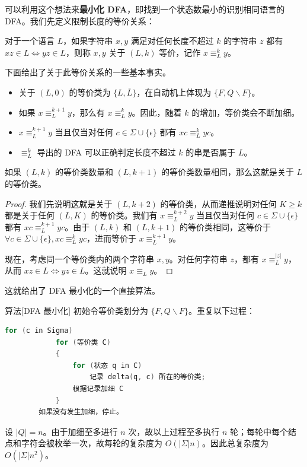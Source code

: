 可以利用这个想法来\textbf{最小化 DFA}，即找到一个状态数最小的识别相同语言的 DFA。我们先定义限制长度的等价关系：

\begin{definition}
    对于一个语言 $L$，如果字符串 $x,y$ 满足对任何长度不超过 $k$ 的字符串 $z$ 都有 $xz\in L\Longleftrightarrow yz\in L$，则称 $x,y$ 关于 $(L,k)$ 等价，记作 $x\equiv_L^k y$。
\end{definition}

下面给出了关于此等价关系的一些基本事实。
\begin{fact}
    \begin{itemize}
        \item 关于 $(L,0)$ 的等价类为 $\{L,\bar L\}$，在自动机上体现为 $\{F,Q\backslash F\}$。
        \item 如果 $x\equiv_L^{k+1} y$，那么有 $x\equiv_L^k y$。因此，随着 $k$ 的增加，等价类会不断加细。
        \item $x\equiv_L^{k+1} y$ 当且仅当对任何 $c\in \Sigma\cup\{\epsilon\}$ 都有 $xc\equiv_L^k yc$。
        \item $\equiv_L^k$ 导出的 DFA 可以正确判定长度不超过 $k$ 的串是否属于 $L$。
    \end{itemize}
\end{fact}

\begin{lemma}
    如果 $(L,k)$ 的等价类数量和 $(L,k+1)$ 的等价类数量相同，那么这就是关于 $L$ 的等价类。
\end{lemma}
\begin{proof}
    我们先说明这就是关于 $(L,k+2)$ 的等价类，从而递推说明对任何 $K\ge k$ 都是关于任何 $(L,K)$ 的等价类。我们有 $x\equiv_L^{k+2} y$ 当且仅当对任何 $c\in \Sigma\cup\{\epsilon\}$ 都有 $xc\equiv_L^{k+1} yc$。由于 $(L,k)$ 和 $(L,k+1)$ 的等价类相同，这等价于 $\forall c\in \Sigma\cup\{\epsilon\}, xc\equiv_L^k yc$，进而等价于 $x\equiv_L^{k+1} y$。
    
    现在，考虑同一个等价类内的两个字符串 $x,y$。对任何字符串 $z$，都有 $x\equiv_L^{|z|} y$，从而 $xz\in L\Longleftrightarrow yz\in L$。这就说明 $x\equiv_L y$。
\end{proof}

这就给出了 DFA 最小化的一个直接算法。
\begin{descbox}{算法}[DFA 最小化]
    初始令等价类划分为 $\{F,Q\backslash F\}$。重复以下过程：
    \begin{lstlisting}[language=C++]
        for (c in Sigma)
            for (等价类 C) 
            {
                for (状态 q in C) 
                    记录 delta(q, c) 所在的等价类;
                根据记录加细 C    
            }
        如果没有发生加细，停止。
    \end{lstlisting}
    设 $|Q|=n$。由于加细至多进行 $n$ 次，故以上过程至多执行 $n$ 轮；每轮中每个结点和字符会被枚举一次，故每轮的复杂度为 $O(|\Sigma|n)$。因此总复杂度为 $O(|\Sigma|n^2)$。
\end{descbox}


